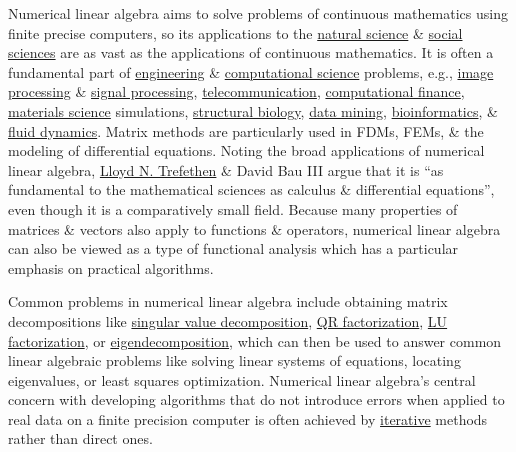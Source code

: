 \documentclass{article}
\begin{document}
Numerical linear algebra aims to solve problems of continuous mathematics using finite precise computers, so its applications to the \href{https://en.wikipedia.org/wiki/Natural_science}{natural science} \& \href{https://en.wikipedia.org/wiki/Social_science}{social sciences} are as vast as the applications of continuous mathematics. It is often a fundamental part of \href{https://en.wikipedia.org/wiki/Engineering}{engineering} \& \href{https://en.wikipedia.org/wiki/Computational_science}{computational science} problems, e.g., \href{https://en.wikipedia.org/wiki/Image_processing}{image processing} \& \href{https://en.wikipedia.org/wiki/Signal_processing}{signal processing}, \href{https://en.wikipedia.org/wiki/Telecommunication}{telecommunication}, \href{https://en.wikipedia.org/wiki/Computational_finance}{computational finance}, \href{https://en.wikipedia.org/wiki/Materials_science}{materials science} simulations, \href{https://en.wikipedia.org/wiki/Structural_biology}{structural biology}, \href{https://en.wikipedia.org/wiki/Data_mining}{data mining}, \href{https://en.wikipedia.org/wiki/Bioinformatics}{bioinformatics}, \& \href{https://en.wikipedia.org/wiki/Fluid_dynamics}{fluid dynamics}. Matrix methods are particularly used in FDMs, FEMs, \& the modeling of differential equations. Noting the broad applications of numerical linear algebra, \href{https://en.wikipedia.org/wiki/Lloyd_N._Trefethen}{\sc Lloyd N. Trefethen} \& {\sc David Bau III} argue that it is ``as fundamental to the mathematical sciences as calculus \& differential equations'', even though it is a comparatively small field. Because many properties of matrices \& vectors also apply to functions \& operators, numerical linear algebra can also be viewed as a type of functional analysis which has a particular emphasis on practical algorithms.

Common problems in numerical linear algebra include obtaining matrix decompositions like \href{https://en.wikipedia.org/wiki/Singular_value_decomposition}{singular value decomposition}, \href{https://en.wikipedia.org/wiki/QR_factorization}{QR factorization}, \href{https://en.wikipedia.org/wiki/LU_factorization}{LU factorization}, or \href{https://en.wikipedia.org/wiki/Eigendecomposition}{eigendecomposition}, which can then be used to answer common linear algebraic problems like solving linear systems of equations, locating eigenvalues, or least squares optimization. Numerical linear algebra's central concern with developing algorithms that do not introduce errors when applied to real data on a finite precision computer is often achieved by \href{https://en.wikipedia.org/wiki/Iterative}{iterative} methods rather than direct ones.
\end{document}
